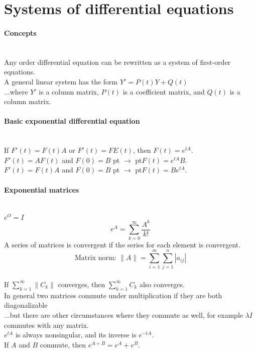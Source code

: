 \documentclass[10pt]{article}
\def\yields{\hskip 5 pt $\to$ \hskip 5 pt}
\begin{document}
\bigskip\bigskip
\section{Systems of differential equations}\smallskip

\paragraph{Concepts}\ \\
Any order differential equation can be rewritten as a system of first-order equations.\\
A general linear system has the form $Y' = P(t)Y + Q(t)$\\
...where $Y'$ is a column matrix, $P(t)$ is a coefficient matrix, and $Q(t)$ is a column matrix.

\paragraph{Basic exponential differential equation}\ \\
If $F'(t) = F(t)A$ or $F'(t) = FE(t)$, then $F(t) = e^{tA}$.\\
$F'(t) = AF(t)$ and $F(0) = B$ \yields $F(t) = e^{tA}B$.\\
$F'(t) = F(t)A$ and $F(0) = B$ \yields $F(t) = Be^{tA}$.

\paragraph{Exponential matrices}\ \\
$e^O = I$
\begin{equation*}e^A = \sum_{k=0}^\infty \frac{A^k}{k!}\end{equation*}
A series of matrices is convergent if the series for each element is convergent.
\begin{equation*}\text{Matrix norm: } \lVert A \rVert = \sum_{i=1}^m \sum_{j=1}^n |a_{ij}|\end{equation*}\\
If $\sum_{k=1}^\infty \lVert C_k \rVert$ converges, then $\sum_{k=1}^\infty C_k$ also converges.\\
In general two matrices commute under multiplication if they are both diagonalizable\\
...but there are other circumstances where they commute as well, for example $\lambda I$ commutes with any matrix.\\
$e^{tA}$ is always nonsingular, and its inverse is $e^{-tA}$.\\
If $A$ and $B$ commute, then $e^{A+B} = e^A + e^B$.
\end{document}

